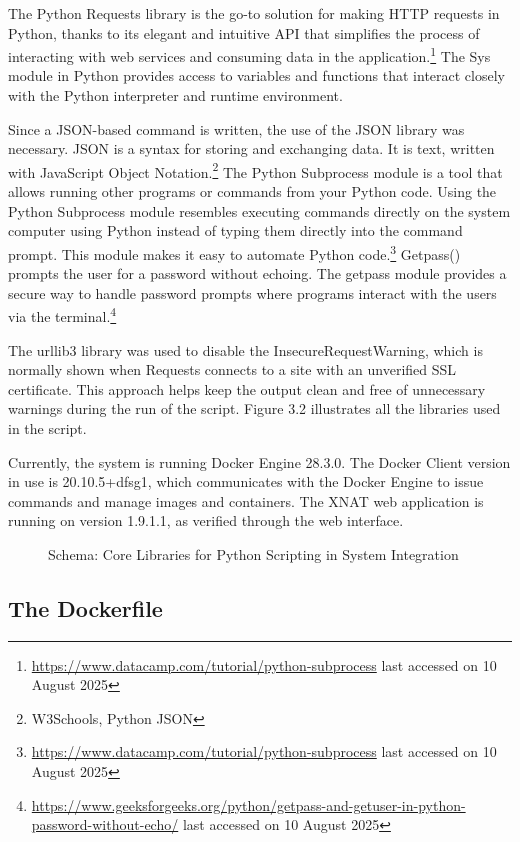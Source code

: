 The Python Requests library is the go-to solution for making \ac{HTTP} requests in Python, thanks to its elegant and intuitive API that simplifies the process of interacting with web services and consuming data in the application.\footnote{\url{https://www.datacamp.com/tutorial/python-subprocess} last accessed on 10 August 2025} The Sys module in Python provides access to variables and functions that interact closely with the Python interpreter and runtime environment.

Since a JSON-based command is written, the use of the JSON library was necessary. JSON is a syntax for storing and exchanging data. It is text, written with JavaScript Object Notation.\footnote{W3Schools, Python JSON}
The Python Subprocess module is a tool that allows running other programs or commands from your Python code. Using the Python Subprocess module resembles executing commands directly on the system computer using Python instead of typing them directly into the command prompt. This module makes it easy to automate Python code.\footnote{\url{https://www.datacamp.com/tutorial/python-subprocess} last accessed on 10 August 2025}
Getpass() prompts the user for a password without echoing. The getpass module provides a secure way to handle password prompts where programs interact with the users via the terminal.\footnote{\url{https://www.geeksforgeeks.org/python/getpass-and-getuser-in-python-password-without-echo/} last accessed on 10 August 2025}

The urllib3 library was used to disable the InsecureRequestWarning, which is normally shown when Requests connects to a site with an unverified SSL certificate. This approach helps keep the output clean and free of unnecessary warnings during the run of the script. Figure 3.2 illustrates all the libraries used in the script.

Currently, the system is running Docker Engine 28.3.0. The Docker Client version in use is 20.10.5+dfsg1, which communicates with the Docker Engine to issue commands and manage images and containers. The XNAT web application is running on version 1.9.1.1, as verified through the web interface.


\begin{figure}[ht]
  \centering
  \def\svgwidth{0.8\linewidth}
  
  \caption{Schema: Core Libraries for Python Scripting in System Integration}
  \label{fig:diagram-core-libraries}
\end{figure}
 
  \subsection{The Dockerfile}
 
